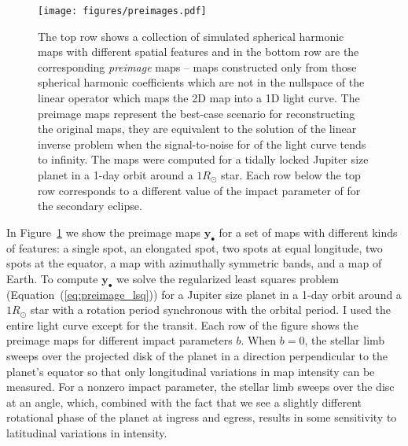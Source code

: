 \documentclass[12pt,dvipsnames]{report}
\begin{document}
\begin{figure}[t!]
    \begin{centering}
        \texttt{[image: figures/preimages.pdf]}
        \caption{
            The top row shows a collection of simulated spherical harmonic maps with different spatial
            features and in the bottom row are the corresponding \emph{preimage} maps -- maps
            constructed only from those spherical harmonic coefficients which are not in the
            nullspace of the linear operator which maps the 2D map into a 1D light curve.
            The preimage maps represent the best-case scenario for reconstructing the original
            maps, they are equivalent to the solution of the linear inverse problem when the signal-to-noise for
            of the light curve tends to infinity.
            The maps were computed for a tidally locked Jupiter size planet in a 1-day orbit around a
            $1R_\odot$ star.
            Each row below the top row corresponds to a different value of the impact parameter of
            for the secondary eclipse.
        }
        \label{fig:preimages:1}
    \end{centering}
\end{figure}

In Figure~\ref{fig:preimages:1} we show the preimage maps
$\mathbf{y}_{\bullet}$ for a set of maps with different kinds of features: a
single spot, an elongated spot, two spots at equal longitude, two spots at the
equator, a map with azimuthally symmetric bands, and a map of Earth. To compute
$\mathbf{y}_{\bullet}$ we solve the regularized least squares problem
(Equation~(\ref{eq:preimage_lsq})) for a Jupiter size planet in a 1-day orbit
around a $1R_\odot$ star with a rotation period synchronous with the orbital
period. I used the entire light curve except for the transit. 
Each row of the figure shows the preimage maps for different impact parameters $b$.
When $b=0$, the stellar limb sweeps over the projected disk of the planet in a
direction perpendicular to the planet's equator so that only longitudinal
variations in map intensity can be measured. For a nonzero impact parameter,
the stellar limb sweeps over the disc at an angle, which, combined with the
fact that we see a slightly different rotational phase of the planet at
ingress and egress, results in some sensitivity to latitudinal variations in
intensity.
\end{document}
